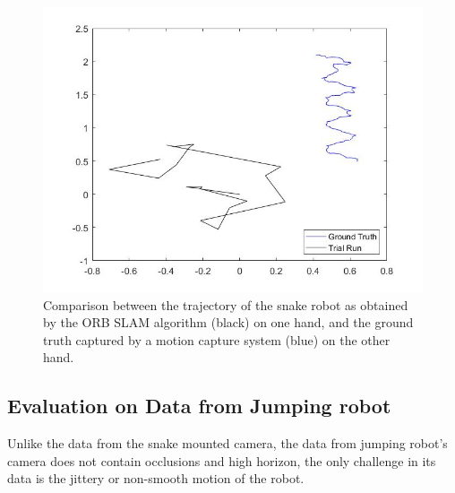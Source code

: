 \begin{figure}[H]
	\centering
	\includegraphics[width=1.0\linewidth]{figures/snakeRun_psCamera_trial1_20170503_ORB}
	\caption{Comparison between the trajectory of the snake robot as obtained by the ORB SLAM algorithm (black) on one hand, and the ground truth captured by a motion capture system (blue) on the other hand.}
	\label{fig:snakerunpscameratrial120170503orb}
\end{figure}

\subsection{Evaluation on Data from Jumping robot}
Unlike the data from the snake mounted camera, the data from jumping robot’s camera does not contain occlusions and high horizon, the only challenge in its data is the jittery or non-smooth motion of the robot.

